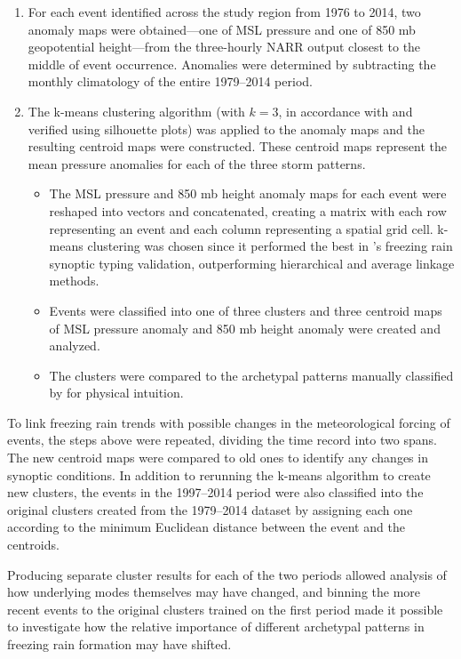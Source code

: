 \documentclass[twocol]{ametsoc}
\begin{document}
\begin{enumerate}
\item
For each event identified across the study region from 1976 to 2014, two anomaly maps were obtained---one of MSL pressure and one of 850 mb geopotential height---from the three-hourly NARR output closest to the middle of event occurrence. Anomalies were determined by subtracting the monthly climatology of the entire 1979--2014 period.
\item
The k-means clustering algorithm (with $k=3$, in accordance with \citet{erfani2012automated} and verified using silhouette plots) was applied to the anomaly maps and the resulting centroid maps were constructed. These centroid maps represent the mean pressure anomalies for each of the three storm patterns.
\begin{itemize}
\item
The MSL pressure and 850 mb height anomaly maps for each event were reshaped into vectors and concatenated, creating a matrix with each row representing an event and each column representing a spatial grid cell. k-means clustering was chosen since it performed the best in \citet{erfani2012automated}'s freezing rain synoptic typing validation, outperforming hierarchical and average linkage methods.
\item
Events were classified into one of three clusters and three centroid maps of MSL pressure anomaly and 850 mb height anomaly were created and analyzed.
\item
The clusters were compared to the archetypal patterns manually classified by \citet{rauber2001synoptic} for physical intuition.
\end{itemize}
\end{enumerate}

To link freezing rain trends with possible changes in the meteorological forcing of events, the steps above were repeated, dividing the time record into two spans. The new centroid maps were compared to old ones to identify any changes in synoptic conditions. In addition to rerunning the k-means algorithm to create new clusters, the events in the 1997--2014 period were also classified into the original clusters created from the 1979--2014 dataset by assigning each one according to the minimum Euclidean distance between the event and the centroids. 

Producing separate cluster results for each of the two periods allowed analysis of how underlying modes themselves may have changed, and binning the more recent events to the original clusters trained on the first period made it possible to investigate how the relative importance of different archetypal patterns in freezing rain formation may have shifted.
\end{document}
